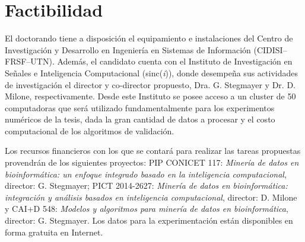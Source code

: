 \documentclass[a4paper,8pt]{article}
\begin{document}
\section{Factibilidad}
El doctorando tiene a disposición el equipamiento e instalaciones del Centro de Investigación y Desarrollo en Ingeniería en Sistemas de Información (CIDISI--FRSF--UTN). Además, el candidato cuenta con el Instituto de Investigación en Señales e Inteligencia Computacional (sinc(\emph{i})), donde desempeña sus actividades de investigación el director y co-director propuesto, Dra. G. Stegmayer y Dr. D. Milone, respectivamente. Desde este Instituto se posee acceso a un cluster de 50 computadoras que será utilizado fundamentalmente para los experimentos numéricos de la tesis, dada la gran cantidad de datos a procesar y el costo computacional de los algoritmos de validación. 

Los recursos financieros con los que se contará para realizar las tareas propuestas provendrán de los siguientes proyectos: PIP CONICET 117: \textit{Minería de datos en bioinformática: un enfoque integrado basado en la inteligencia computacional}, director: G. Stegmayer; PICT 2014-2627: \textit{Minería de datos en bioinformática: integración y análisis basados en inteligencia computacional}, director: D. Milone y CAI+D 548: \textit{Modelos y algoritmos para minería de datos en bioinformática}, director: G. Stegmayer.
Los datos para la experimentación están disponibles en forma gratuita en Internet.




\end{document}
